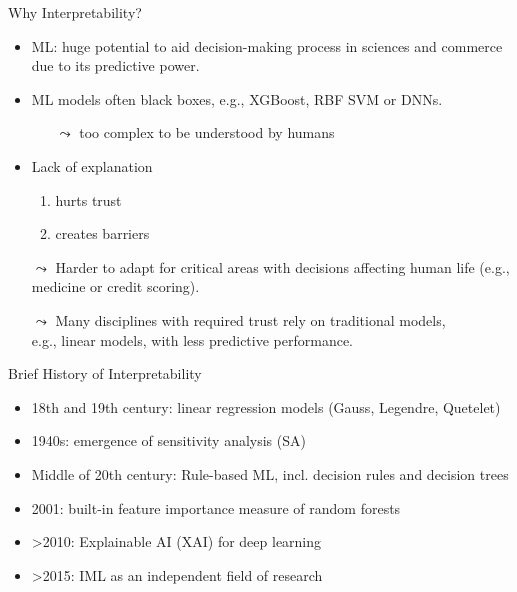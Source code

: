 \documentclass[11pt,compress,t,notes=noshow, aspectratio=169, xcolor=table]{beamer}
\begin{document}
\begin{frame}{Why Interpretability?}
		\begin{itemize}
			\item ML: huge potential to aid decision-making process in sciences and commerce due to its predictive power.
			\pause
			\smallskip
			\item ML models often black boxes, e.g., XGBoost, RBF SVM or DNNs.
			\begin{itemize}
				\item[$\leadsto$] too complex to be understood by humans
			\end{itemize}
			\pause
			\smallskip
			\item Lack of explanation
			\begin{enumerate}
				\item hurts trust
				\item creates barriers
			\end{enumerate}
			\pause
			\smallskip
		    \item[$\leadsto$] Harder to adapt for critical areas with decisions affecting human life (e.g., medicine or credit scoring).
			\pause
			\item[$\leadsto$] Many disciplines with required trust rely on traditional models,\\ e.g., linear models, with less predictive performance.
		\end{itemize}
	\end{frame}


	\begin{frame}{Brief History of Interpretability}
		\begin{itemize}
			\item 18th and 19th century: linear regression models (Gauss, Legendre, Quetelet)
			\medskip
			\item 1940s: emergence of sensitivity analysis (SA)
			\medskip
			\item Middle of 20th century: Rule-based ML, incl. decision rules and decision trees
			\medskip
			\item 2001: built-in feature importance measure of random forests
			\medskip
			\item >2010: Explainable AI (XAI) for deep learning
			\medskip
			\item >2015: IML as an independent field of research
		\end{itemize}
	\end{frame}
\end{document}
